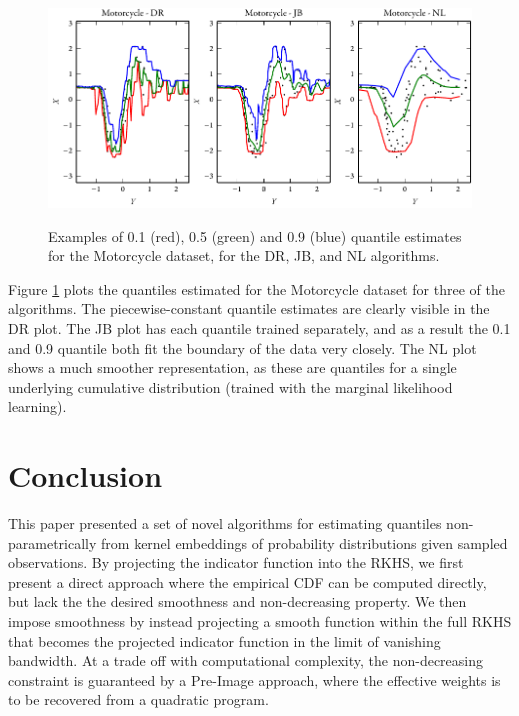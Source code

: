 \documentclass[twoside]{article} \usepackage{aistats2017}
\theoremstyle{definition}
\theoremstyle{theorem}
\begin{document}
		\begin{figure}[t]
			\begin{center}
				\includegraphics[width=\columnwidth]{figures/mcquantilesall}\\
			\end{center}
			\caption{Examples of 0.1 (red), 0.5 (green) and 0.9 (blue) quantile estimates for the Motorcycle dataset, for the DR, JB, and NL algorithms.}
			\label{fig:motorcycleresults} 
		\end{figure}
		
		Figure \ref{fig:motorcycleresults} plots the quantiles estimated for the Motorcycle dataset for three of the algorithms. The piecewise-constant quantile estimates are clearly visible in the DR plot. The JB plot has each quantile trained separately, and as a result the 0.1 and 0.9 quantile both fit the boundary of the data very closely. The NL plot shows a much smoother representation, as these are quantiles for a single underlying cumulative distribution (trained with the marginal likelihood learning).

\section{Conclusion}
\label{sec:conclusion}
	
	This paper presented a set of novel algorithms for estimating quantiles non-parametrically from kernel embeddings of probability distributions given sampled observations. By projecting the indicator function into the RKHS, we first present a direct approach where the empirical CDF can be computed directly, but lack the the desired smoothness and non-decreasing property. We then impose smoothness by instead projecting a smooth function within the full RKHS that becomes the projected indicator function in the limit of vanishing bandwidth. At a trade off with computational complexity, the non-decreasing constraint is guaranteed by a Pre-Image approach, where the effective weights is to be recovered from a quadratic program.
	
\end{document}
